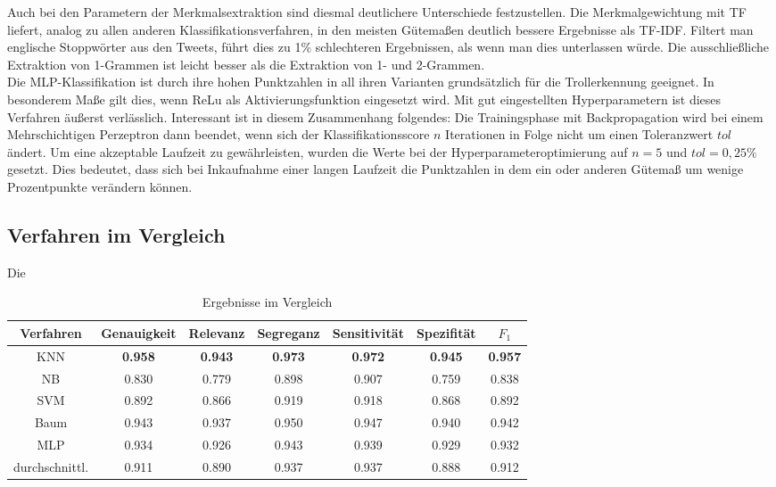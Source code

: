 Auch bei den Parametern der Merkmalsextraktion sind diesmal deutlichere Unterschiede festzustellen. Die Merkmalgewichtung mit TF liefert, analog zu allen anderen Klassifikationsverfahren, in den meisten Gütemaßen deutlich bessere Ergebnisse als TF-IDF. Filtert man englische Stoppwörter aus den Tweets, führt dies zu 1\% schlechteren Ergebnissen, als wenn man dies unterlassen würde. Die ausschließliche Extraktion von 1-Grammen ist leicht besser als die Extraktion von 1- und 2-Grammen.\\
Die MLP-Klassifikation ist durch ihre hohen Punktzahlen in all ihren Varianten grundsätzlich für die Trollerkennung geeignet. In besonderem Maße gilt dies, wenn ReLu als Aktivierungsfunktion eingesetzt wird. Mit gut eingestellten Hyperparametern ist dieses Verfahren äußerst verlässlich. Interessant ist in diesem Zusammenhang folgendes: Die Trainingsphase mit Backpropagation wird bei einem Mehrschichtigen Perzeptron dann beendet, wenn sich der Klassifikationsscore $n$ Iterationen in Folge nicht um einen Toleranzwert $tol$ ändert. Um eine akzeptable Laufzeit zu gewährleisten, wurden die Werte bei der Hyperparameteroptimierung auf $n = 5$ und $tol = 0,25\%$ gesetzt. Dies bedeutet, dass sich bei Inkaufnahme einer langen Laufzeit die Punktzahlen in dem ein oder anderen Gütemaß um wenige Prozentpunkte verändern können.
\pagebreak
\subsection{Verfahren im Vergleich}
Die 
\begin{table}[htb]
	\begin{center}
		\begin{tabular}{|c|c|c|c|c|c|c|}
			\hline 
			Verfahren & Genauigkeit & Relevanz & Segreganz & Sensitivität & Spezifität & $F_1$ \\ \hline \hline
			KNN      & \textbf{0.958} & \textbf{0.943} & \textbf{0.973} & \textbf{0.972} & \textbf{0.945} & \textbf{0.957} \\ \hline
			NB   & 0.830 & 0.779 & 0.898 & 0.907 & 0.759 & 0.838 \\ \hline 
			SVM & 0.892 & 0.866 & 0.919 & 0.918 & 0.868 & 0.892 \\ \hline 
			Baum   & 0.943 & 0.937 & 0.950 & 0.947 & 0.940 & 0.942 \\ \hline
			MLP   & 0.934 & 0.926 & 0.943 & 0.939 & 0.929 & 0.932 \\ \hline \hline
			durchschnittl. & 0.911 & 0.890 & 0.937 & 0.937 & 0.888 & 0.912 \\ \hline
		\end{tabular}
		\caption{Ergebnisse im Vergleich}\label{results-all}
	\end{center}
\end{table}\\